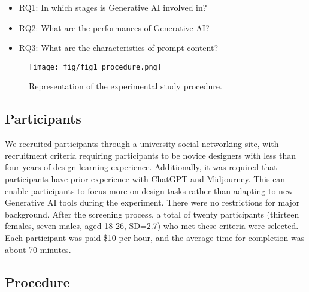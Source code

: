 \documentclass{dsj}
\begin{document}
\begin{itemize}
  \item RQ1: In which stages is Generative AI involved in?
  \item RQ2: What are the performances of Generative AI?
  \item RQ3: What are the characteristics of prompt content?
\end{itemize}

\begin{figure}[htp]
    \centering
    \texttt{[image: fig/fig1\_procedure.png]}
    \caption{Representation of the experimental study procedure.}
    \label{fig:procedure}
    \vspace{-0.1in}
\end{figure}

\subsection{Participants}

We recruited participants through a university social networking site, with recruitment criteria requiring participants to be novice designers with less than four years of design learning experience. Additionally, it was required that participants have prior experience with ChatGPT and Midjourney. This can enable participants to focus more on design tasks rather than adapting to new Generative AI tools during the experiment. There were no restrictions for major background. After the screening process, a total of twenty participants (thirteen females, seven males, aged 18-26, SD=2.7) who met these criteria were selected. Each participant was paid \$10 per hour, and the average time for completion was about 70 minutes. 

\subsection{Procedure}
\end{document}
